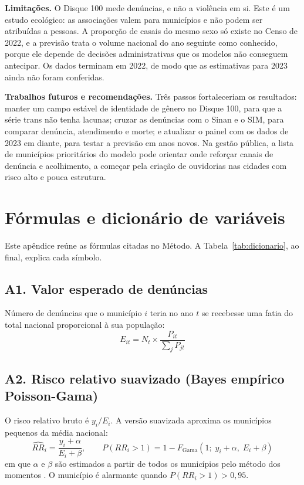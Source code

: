 \documentclass[12pt]{article}
\begin{document}
\textbf{Limitações.} O Disque 100 mede denúncias, e não a violência em si. Este é um estudo ecológico: as associações valem para municípios e não podem ser atribuídas a pessoas. A proporção de casais do mesmo sexo só existe no Censo de 2022, e a previsão trata o volume nacional do ano seguinte como conhecido, porque ele depende de decisões administrativas que os modelos não conseguem antecipar. Os dados terminam em 2022, de modo que as estimativas para 2023 ainda não foram conferidas.

\textbf{Trabalhos futuros e recomendações.} Três passos fortaleceriam os resultados: manter um campo estável de identidade de gênero no Disque 100, para que a série trans não tenha lacunas; cruzar as denúncias com o Sinan e o SIM, para comparar denúncia, atendimento e morte; e atualizar o painel com os dados de 2023 em diante, para testar a previsão em anos novos. Na gestão pública, a lista de municípios prioritários do modelo pode orientar onde reforçar canais de denúncia e acolhimento, a começar pela criação de ouvidorias nas cidades com risco alto e pouca estrutura.

\appendix

\section{Fórmulas e dicionário de variáveis}

Este apêndice reúne as fórmulas citadas no Método. A Tabela~\ref{tab:dicionario}, ao final, explica cada símbolo.

\subsection*{A1. Valor esperado de denúncias}
Número de denúncias que o município $i$ teria no ano $t$ se recebesse uma fatia do total nacional proporcional à sua população:
\begin{equation*}
E_{it} = N_t \times \frac{P_{it}}{\sum_j P_{jt}}
\end{equation*}

\subsection*{A2. Risco relativo suavizado (Bayes empírico Poisson-Gama)}
O risco relativo bruto é $y_i/E_i$. A versão suavizada aproxima os municípios pequenos da média nacional:
\begin{equation*}
\widehat{RR}_i = \frac{y_i + \alpha}{E_i + \beta}, \qquad
P(RR_i > 1) = 1 - F_{\text{Gama}}\!\left(1;\; y_i+\alpha,\; E_i+\beta\right)
\end{equation*}
em que $\alpha$ e $\beta$ são estimados a partir de todos os municípios pelo método dos momentos \cite{marshall:1991}. O município é alarmante quando $P(RR_i>1) > 0{,}95$.
\end{document}
